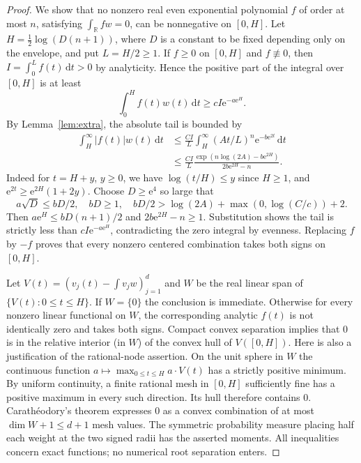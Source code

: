 \documentclass[11pt]{article}
\theoremstyle{remark}\newtheorem{remark}[theorem]{Remark}
\newcommand{\R}{\mathbb R}
\newcommand{\e}{\mathrm e}
\newcommand{\dd}{\,\mathrm d}
\begin{document}
\begin{proof}
We show that no nonzero real even exponential polynomial $f$ of order at most $n$, satisfying $\int_{\R} f w=0$, can be nonnegative on $[0,H]$. Let $H=\tfrac12\log(D(n+1))$, where $D$ is a constant to be fixed depending only on the envelope, and put $L=H/2\ge1$. If $f\ge0$ on $[0,H]$ and $f\not\equiv0$, then $I=\int_0^L f(t)\dd t>0$ by analyticity. Hence the positive part of the integral over $[0,H]$ is at least
\[
 \int_0^H f(t)w(t)\dd t\ge cI\e^{-a\e^H}.
\]
By Lemma~\ref{lem:extra}, the absolute tail is bounded by
\begin{align*}
 \int_H^\infty |f(t)|w(t)\dd t
 &\le \frac{CI}{L}\int_H^\infty (At/L)^n\e^{-b\e^{2t}}\dd t\\
 &\le \frac{CI}{L}\frac{\exp(n\log(2A)-b\e^{2H})}{2b\e^{2H}-n}.
\end{align*}
Indeed for $t=H+y$, $y\ge0$, we have $\log(t/H)\le y$ since $H\ge1$, and $\e^{2t}\ge\e^{2H}(1+2y)$. Choose $D\ge\e^4$ so large that
\[
 a\sqrt D\le bD/2,\quad bD\ge 1,\quad
 bD/2>\log(2A)+\max(0,\log(C/c))+2.
\]
Then $a\e^H\le bD(n+1)/2$ and $2b\e^{2H}-n\ge1$. Substitution shows the tail is strictly less than $cI\e^{-a\e^H}$, contradicting the zero integral by evenness. Replacing $f$ by $-f$ proves that every nonzero centered combination takes both signs on $[0,H]$.

Let $V(t)=(v_j(t)-\int v_jw)_{j=1}^d$ and $W$ be the real linear span of $\{V(t):0\le t\le H\}$. If $W=\{0\}$ the conclusion is immediate. Otherwise for every nonzero linear functional on $W$, the corresponding analytic $f(t)$ is not identically zero and takes both signs. Compact convex separation implies that $0$ is in the relative interior (in $W$) of the convex hull of $V([0,H])$. Here is also a justification of the rational-node assertion. On the unit sphere in $W$ the continuous function $a\mapsto\max_{0\le t\le H} a\cdot V(t)$ has a strictly positive minimum. By uniform continuity, a finite rational mesh in $[0,H]$ sufficiently fine has a positive maximum in every such direction. Its hull therefore contains $0$. Carath\'eodory's theorem expresses $0$ as a convex combination of at most $\dim W+1\le d+1$ mesh values. The symmetric probability measure placing half each weight at the two signed radii has the asserted moments. All inequalities concern exact functions; no numerical root separation enters.
\end{proof}
\end{document}
